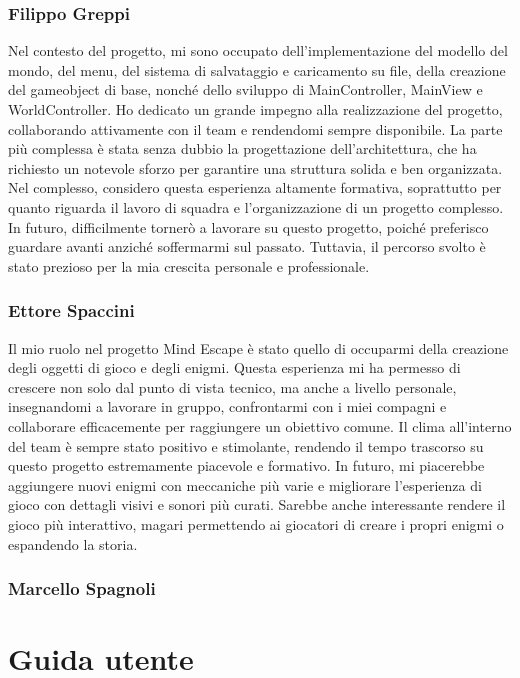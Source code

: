 \documentclass[a4paper,12pt]{report}
\begin{document}
%
\subsection{Filippo Greppi}
Nel contesto del progetto, mi sono occupato dell’implementazione del modello del mondo, del menu, del sistema di salvataggio e caricamento su file, della creazione del gameobject di base, nonché dello sviluppo di MainController, MainView e WorldController. Ho dedicato un grande impegno alla realizzazione del progetto, collaborando attivamente con il team e rendendomi sempre disponibile.
La parte più complessa è stata senza dubbio la progettazione dell’architettura, che ha richiesto un notevole sforzo per garantire una struttura solida e ben organizzata. Nel complesso, considero questa esperienza altamente formativa, soprattutto per quanto riguarda il lavoro di squadra e l’organizzazione di un progetto complesso.
In futuro, difficilmente tornerò a lavorare su questo progetto, poiché preferisco guardare avanti anziché soffermarmi sul passato. Tuttavia, il percorso svolto è stato prezioso per la mia crescita personale e professionale.

\subsection{Ettore Spaccini}
Il mio ruolo nel progetto Mind Escape è stato quello di occuparmi della creazione degli oggetti di gioco e degli enigmi. Questa esperienza mi ha permesso di crescere non solo dal punto di vista tecnico, ma anche a livello personale, insegnandomi a lavorare in gruppo, confrontarmi con i miei compagni e collaborare efficacemente per raggiungere un obiettivo comune. Il clima all'interno del team è sempre stato positivo e stimolante, rendendo il tempo trascorso su questo progetto estremamente piacevole e formativo.
In futuro, mi piacerebbe aggiungere nuovi enigmi con meccaniche più varie e migliorare l'esperienza di gioco con dettagli visivi e sonori più curati. Sarebbe anche interessante rendere il gioco più interattivo, magari permettendo ai giocatori di creare i propri enigmi o espandendo la storia.

\subsection{Marcello Spagnoli}


\appendix
\chapter{Guida utente}
\end{document}
